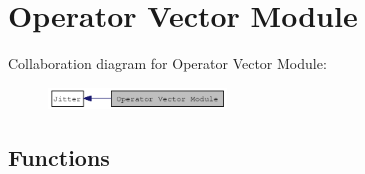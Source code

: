 \hypertarget{group__opvecmod}{
\section{Operator Vector Module}
\label{group__opvecmod}
}


Collaboration diagram for Operator Vector Module:\nopagebreak
\begin{figure}[H]
\begin{center}
\leavevmode
\includegraphics[width=134pt]{group__opvecmod}
\end{center}
\end{figure}
\subsection*{Functions}
